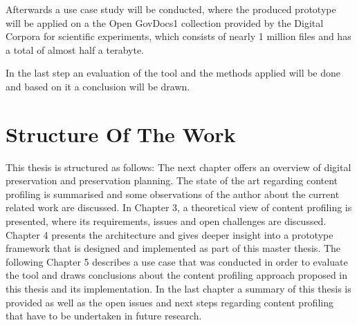 Afterwards a use case study will be conducted, where the produced prototype will be applied on a the Open GovDocs1 collection provided by the Digital Corpora for scientific experiments, which consists of nearly 1 million files and has a total of almost half a terabyte. 

In the last step an evaluation of the tool and the methods applied will be done and based on it a conclusion will be drawn.

\section{Structure Of The Work}
\label{sec:structure_of_the_work}
This thesis is structured as follows: The next chapter offers an overview of digital preservation and preservation planning. The state of the art regarding content profiling is summarised and some observations of the author about the current related work are discussed. In Chapter 3, a theoretical view of content profiling is presented, where its requirements, issues and open challenges are discussed. Chapter 4 presents the architecture and gives deeper insight into a prototype framework that is designed and implemented as part of this master thesis. The following Chapter 5 describes a use case that was conducted in order to evaluate the tool and draws conclusions about the content profiling approach proposed in this thesis and its implementation. In the last chapter a summary of this thesis is provided as well as the open issues and next steps regarding content profiling that have to be undertaken in future research.